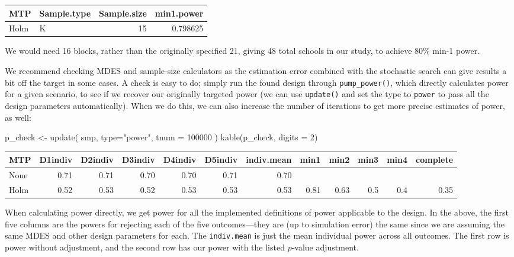 \documentclass[
]{article}
\newenvironment{Shaded}{\begin{snugshade}}{\end{snugshade}}
\newcommand{\AttributeTok}[1]{\textcolor[rgb]{0.77,0.63,0.00}{#1}}
\newcommand{\DecValTok}[1]{\textcolor[rgb]{0.00,0.00,0.81}{#1}}
\newcommand{\FunctionTok}[1]{\textcolor[rgb]{0.00,0.00,0.00}{#1}}
\newcommand{\NormalTok}[1]{#1}
\newcommand{\OtherTok}[1]{\textcolor[rgb]{0.56,0.35,0.01}{#1}}
\newcommand{\StringTok}[1]{\textcolor[rgb]{0.31,0.60,0.02}{#1}}
\begin{document}
\begin{tabular}{l|l|r|r}
\hline
MTP & Sample.type & Sample.size & min1.power\\
\hline
Holm & K & 15 & 0.798625\\
\hline
\end{tabular}

We would need 16 blocks, rather than the originally specified 21, giving
48 total schools in our study, to achieve 80\% min-1 power.

We recommend checking MDES and sample-size calculators as the estimation
error combined with the stochastic search can give results a bit off the
target in some cases. A check is easy to do; simply run the found design
through \texttt{pump\_power()}, which directly calculates power for a
given scenario, to see if we recover our originally targeted power (we
can use \texttt{update()} and set the type to \texttt{power} to pass all
the design parameters automatically). When we do this, we can also
increase the number of iterations to get more precise estimates of
power, as well:

\begin{Shaded}
\begin{Highlighting}[]
\NormalTok{p\_check }\OtherTok{\textless{}{-}} \FunctionTok{update}\NormalTok{( smp, }\AttributeTok{type=}\StringTok{"power"}\NormalTok{, }\AttributeTok{tnum =} \DecValTok{100000}\NormalTok{ )}
\FunctionTok{kable}\NormalTok{(p\_check, }\AttributeTok{digits =} \DecValTok{2}\NormalTok{)}
\end{Highlighting}
\end{Shaded}

\begin{tabular}{l|r|r|r|r|r|r|r|r|r|r|r}
\hline
MTP & D1indiv & D2indiv & D3indiv & D4indiv & D5indiv & indiv.mean & min1 & min2 & min3 & min4 & complete\\
\hline
None & 0.71 & 0.71 & 0.70 & 0.70 & 0.71 & 0.70 &  &  &  &  & \\
\hline
Holm & 0.52 & 0.53 & 0.52 & 0.53 & 0.53 & 0.53 & 0.81 & 0.63 & 0.5 & 0.4 & 0.35\\
\hline
\end{tabular}

When calculating power directly, we get power for all the implemented
definitions of power applicable to the design. In the above, the first
five columns are the powers for rejecting each of the five
outcomes---they are (up to simulation error) the same since we are
assuming the same MDES and other design parameters for each. The
\texttt{indiv.mean} is just the mean individual power across all
outcomes. The first row is power without adjustment, and the second row
has our power with the listed \(p\)-value adjustment.
\end{document}
